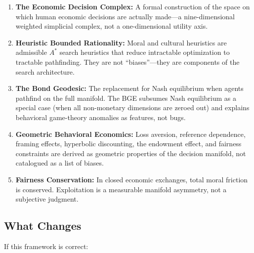 \documentclass[12pt]{article}
\theoremstyle{definition}
\theoremstyle{remark}
\begin{document}
\begin{enumerate}
    \item \textbf{The Economic Decision Complex:} A formal construction of the space on which human economic decisions are actually made---a nine-dimensional weighted simplicial complex, not a one-dimensional utility axis.

    \item \textbf{Heuristic Bounded Rationality:} Moral and cultural heuristics are admissible $A^*$ search heuristics that reduce intractable optimization to tractable pathfinding.  They are not ``biases''---they are components of the search architecture.

    \item \textbf{The Bond Geodesic:} The replacement for Nash equilibrium when agents pathfind on the full manifold.  The BGE subsumes Nash equilibrium as a special case (when all non-monetary dimensions are zeroed out) and explains behavioral game-theory anomalies as features, not bugs.

    \item \textbf{Geometric Behavioral Economics:} Loss aversion, reference dependence, framing effects, hyperbolic discounting, the endowment effect, and fairness constraints are derived as geometric properties of the decision manifold, not catalogued as a list of biases.

    \item \textbf{Fairness Conservation:} In closed economic exchanges, total moral friction is conserved.  Exploitation is a measurable manifold asymmetry, not a subjective judgment.
\end{enumerate}

\subsection{What Changes}

If this framework is correct:
\end{document}
